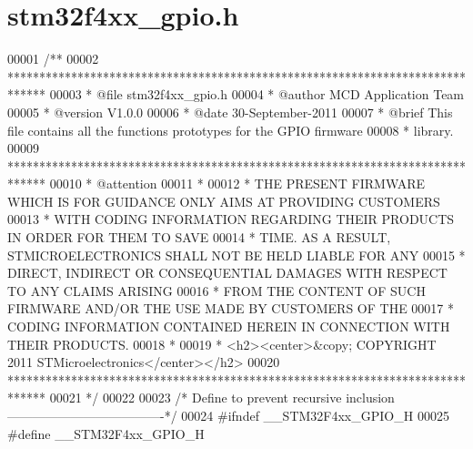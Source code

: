 \section{stm32f4xx\+\_\+gpio.\+h}
\label{stm32f4xx__gpio_8h_source}

\begin{DoxyCode}
00001 \textcolor{comment}{/**}
00002 \textcolor{comment}{  ******************************************************************************}
00003 \textcolor{comment}{  * @file    stm32f4xx\_gpio.h}
00004 \textcolor{comment}{  * @author  MCD Application Team}
00005 \textcolor{comment}{  * @version V1.0.0}
00006 \textcolor{comment}{  * @date    30-September-2011}
00007 \textcolor{comment}{  * @brief   This file contains all the functions prototypes for the GPIO firmware}
00008 \textcolor{comment}{  *          library.}
00009 \textcolor{comment}{  ******************************************************************************}
00010 \textcolor{comment}{  * @attention}
00011 \textcolor{comment}{  *}
00012 \textcolor{comment}{  * THE PRESENT FIRMWARE WHICH IS FOR GUIDANCE ONLY AIMS AT PROVIDING CUSTOMERS}
00013 \textcolor{comment}{  * WITH CODING INFORMATION REGARDING THEIR PRODUCTS IN ORDER FOR THEM TO SAVE}
00014 \textcolor{comment}{  * TIME. AS A RESULT, STMICROELECTRONICS SHALL NOT BE HELD LIABLE FOR ANY}
00015 \textcolor{comment}{  * DIRECT, INDIRECT OR CONSEQUENTIAL DAMAGES WITH RESPECT TO ANY CLAIMS ARISING}
00016 \textcolor{comment}{  * FROM THE CONTENT OF SUCH FIRMWARE AND/OR THE USE MADE BY CUSTOMERS OF THE}
00017 \textcolor{comment}{  * CODING INFORMATION CONTAINED HEREIN IN CONNECTION WITH THEIR PRODUCTS.}
00018 \textcolor{comment}{  *}
00019 \textcolor{comment}{  * <h2><center>&copy; COPYRIGHT 2011 STMicroelectronics</center></h2>}
00020 \textcolor{comment}{  ******************************************************************************}
00021 \textcolor{comment}{  */}
00022 
00023 \textcolor{comment}{/* Define to prevent recursive inclusion -------------------------------------*/}
00024 \textcolor{preprocessor}{#}\textcolor{preprocessor}{ifndef} \textcolor{preprocessor}{\_\_STM32F4xx\_GPIO\_H}
00025 \textcolor{preprocessor}{#}\textcolor{preprocessor}{define} \textcolor{preprocessor}{\_\_STM32F4xx\_GPIO\_H}

\end{DoxyCode}
